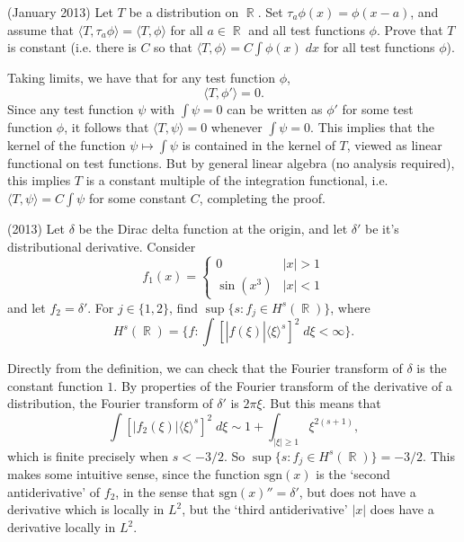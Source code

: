 \documentclass[answers]{exam}
\DeclareMathOperator{\RR}{\mathbb{R}}
\begin{document}
\begin{questions}
\question (January 2013) Let $T$ be a distribution on $\RR$. Set $\tau_a \phi(x) = \phi(x - a)$, and assume that $\langle T, \tau_a \phi \rangle = \langle T, \phi \rangle$ for all $a \in \RR$ and all test functions $\phi$. Prove that $T$ is constant (i.e. there is $C$ so that $\langle T, \phi \rangle = C \int \phi(x)\; dx$ for all test functions $\phi$).
\begin{solution}
	Taking limits, we have that for any test function $\phi$,
	\[ \langle T, \phi' \rangle = 0. \]
	Since any test function $\psi$ with $\int \psi = 0$ can be written as $\phi'$ for some test function $\phi$, it follows that $\langle T, \psi \rangle = 0$ whenever $\int \psi = 0$. This implies that the kernel of the function $\psi \mapsto \int \psi$ is contained in the kernel of $T$, viewed as linear functional on test functions. But by general linear algebra (no analysis required), this implies $T$ is a constant multiple of the integration functional, i.e. $\langle T, \psi \rangle = C \int \psi$ for some constant $C$, completing the proof.
\end{solution}

\question (2013) Let $\delta$ be the Dirac delta function at the origin, and let $\delta'$ be it's distributional derivative. Consider
%
\[ f_1(x) = \begin{cases} 0 & |x| > 1 \\ \sin(x^3) & |x| < 1 \end{cases} \]
%
and let $f_2 = \delta'$. For $j \in \{ 1, 2 \}$, find $\sup \{ s: f_j \in H^s(\RR) \}$, where
%
\[ H^s(\RR) = \{ f : \int [ |\widehat{f}(\xi)| \langle \xi \rangle^s ]^2\; d\xi < \infty \}. \]
\begin{solution}
	Directly from the definition, we can check that the Fourier transform of $\delta$ is the constant function $1$. By properties of the Fourier transform of the derivative of a distribution, the Fourier transform of $\delta'$ is $2 \pi \xi$. But this means that
	\[ \int [ |f_2(\xi)| \langle \xi \rangle^s ]^2\; d\xi \sim 1 + \int_{|\xi| \geq 1} \xi^{2(s+1)}, \]
	which is finite precisely when $s < -3/2$. So $\sup \{ s : f_j \in H^s(\RR) \} = -3/2$. This makes some intuitive sense, since the function $\text{sgn}(x)$ is the `second antiderivative' of $f_2$, in the sense that $\text{sgn}(x)'' = \delta'$, but does not have a derivative which is locally in $L^2$, but the `third antiderivative' $|x|$ does have a derivative locally in $L^2$.


\end{solution}
\end{questions}
\end{document}
